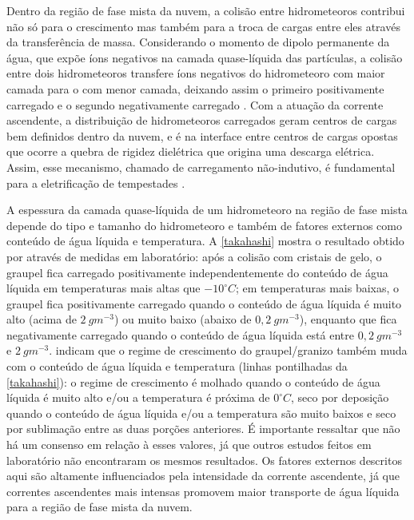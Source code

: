 Dentro da região de fase mista da nuvem, a colisão entre hidrometeoros contribui não só para o crescimento mas também para a troca de cargas entre eles através da transferência de massa. Considerando o momento de dipolo permanente da água, que expõe íons negativos na camada quase-líquida das partículas, a colisão entre dois hidrometeoros transfere íons negativos do hidrometeoro com maior camada para o com menor camada, deixando assim o primeiro positivamente carregado e o segundo negativamente carregado \cite{Baker1987, Baker1994b}. Com a atuação da corrente ascendente, a distribuição de hidrometeoros carregados geram centros de cargas bem definidos dentro da nuvem, e é na interface entre centros de cargas opostas que ocorre a quebra de rigidez dielétrica que origina uma descarga elétrica. Assim, esse mecanismo, chamado de carregamento não-indutivo, é fundamental para a eletrificação de tempestades \cite{Saunders2008}.

A espessura da camada quase-líquida de um hidrometeoro na região de fase mista depende do tipo e tamanho do hidrometeoro e também de fatores externos como conteúdo de água líquida e temperatura. A \autoref{takahashi} mostra o resultado obtido por  através de medidas em laboratório: após a colisão com cristais de gelo, o graupel fica carregado positivamente independentemente do conteúdo de água líquida em temperaturas mais altas que $-10^{\circ}C$; em temperaturas mais baixas, o graupel fica positivamente carregado quando o conteúdo de água líquida é muito alto (acima de $2\:gm^{-3}$) ou muito baixo (abaixo de $0,2\:gm^{-3}$), enquanto que fica negativamente carregado quando o conteúdo de água líquida está entre $0,2\:gm^{-3}$ e $2\:gm^{-3}$.  indicam que o regime de crescimento do graupel/granizo também muda com o conteúdo de água líquida e temperatura (linhas pontilhadas da \autoref{takahashi}): o regime de crescimento é molhado quando o conteúdo de água líquida é muito alto e/ou a temperatura é próxima de $0^{\circ}C$, seco por deposição quando o conteúdo de água líquida e/ou a temperatura são muito baixos e seco por sublimação entre as duas porções anteriores. É importante ressaltar que não há um consenso em relação à esses valores, já que outros estudos feitos em laboratório \cite{Jayaratne1983, Pereyra2000, Saunders2006} não encontraram os mesmos resultados. Os fatores externos descritos aqui são altamente influenciados pela intensidade da corrente ascendente, já que correntes ascendentes mais intensas promovem maior transporte de água líquida para a região de fase mista da nuvem. 

